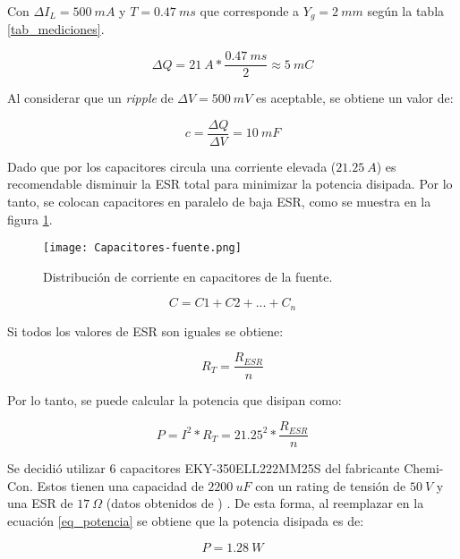 \noindent Con $\Delta I_L=500 \:mA$ y $T=0.47\:ms$ que corresponde a $Y_g = 2 \:mm$ según la tabla \ref{tab_mediciones}.

\begin{equation} 
	\Delta Q = 21\:A * \frac{0.47\:ms}{2} \approx 5\:mC
\end{equation}

\noindent Al considerar que un \textsl{ripple} de $\Delta V=500 \:mV$ es aceptable, se obtiene un valor de:

\begin{equation} 
	c = \frac{\Delta Q}{\Delta V} = 10 \:mF
\end{equation}

\noindent Dado que por los capacitores circula una corriente elevada ($21.25\:A$) es recomendable disminuir la ESR total para minimizar la potencia disipada. Por lo tanto, se colocan capacitores en paralelo de baja ESR, como se muestra en la figura \ref{fig:img_capacitores-fuente}.

\begin{figure}[H]
	\centering
	\texttt{[image: Capacitores-fuente.png]}
	\caption{Distribución de corriente en capacitores de la fuente.}
	\label{fig:img_capacitores-fuente}
\end{figure}


\begin{equation} 
	C = C1 + C2 + ... + C_n
\end{equation}


\noindent Si todos los valores de ESR son iguales se obtiene:

\begin{equation} 
	R_T = \frac{R_{ESR}}{n}
\end{equation}

\noindent Por lo tanto, se puede calcular la potencia que disipan como:

\begin{equation}\label{eq_potencia} 
	P = I^2 * R_T = 21.25^2 * \frac{R_{ESR}}{n}
\end{equation}

\noindent Se decidió utilizar 6 capacitores  EKY-350ELL222MM25S del fabricante Chemi-Con. Estos tienen una capacidad de $2200 \:uF$ con un rating de tensión de $50\:V$ y una ESR de $17 \:\Omega$ (datos obtenidos de \cite{EKY-350ELL222MM25S}) . De esta forma, al reemplazar en la ecuación \ref{eq_potencia} se obtiene que la potencia disipada es de: 

\begin{equation} 
	P=1.28\:W
\end{equation}

